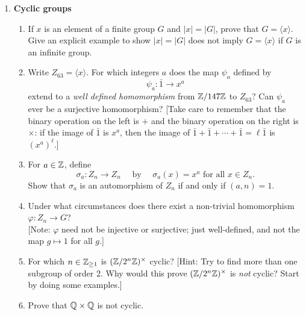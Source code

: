 \documentclass[11pt, reqno]{amsart}
\theoremstyle{plain}
\theoremstyle{definition}
\theoremstyle{example}
\def\<{\langle} \def\>{\rangle}
\def\f{\varphi}
\begin{document}
\begin{enumerate}[1.]
\begin{enumerate}[(a)]
\end{enumerate}

\item {\bf Cyclic groups}
\begin{enumerate}
\item If $x$ is an element of a finite group $G$ and $|x| = |G|$, prove that $G = \<x\>$. Give an explicit example to show $|x| = |G|$ does not imply $G = \<x\>$ if $G$ is an infinite group.
\item Write $Z_{63} = \<x\>$. For which integers $a$ does the map $\psi_a$ defined by 
$$\psi_a : \bar{1} \to x^a$$
extend to a \emph{well defined homomorphism} from $\mathbb{Z}/147 \mathbb{Z}$ to $Z_{63}$? Can $\psi_a$ ever be a surjective homomorphism? 
{\small[Take care to remember that the binary operation on the left is $+$ and the binary operation on the right is $\times$: if the image of  $\bar{1}$ is $x^a$, then the image of $\bar{1} + \bar{1} + \cdots + \bar{1} = \ell\bar{1}$ is $(x^{a})^{\ell}$.]}
\item For $a \in \mathbb{Z}$, define 
$$\sigma_a: Z_n \to Z_n \quad \text{ by } \quad \sigma_a(x) = x^a \text{ for all } x \in Z_n.$$
Show that $\sigma_a$ is an automorphism of $Z_n$ if and only if $(a, n) = 1$. 
\item Under what circumstances does there exist a non-trivial homomorphism $\f: Z_n \to G$? \\{\small[Note: $\f$ need not be injective or surjective; just well-defined, and not the map $g \mapsto 1$ for all $g$.]}
\item For which $n \in \mathbb{Z}_{\ge 1}$ is $(\mathbb{Z}/2^n\mathbb{Z})^\times$ cyclic? \hfill {\small[Hint: Try to find more than one subgroup of order 2. Why would this prove $(\mathbb{Z}/2^n\mathbb{Z})^\times$ is \emph{not} cyclic? Start by doing some examples.]}
\item Prove that $\mathbb{Q} \times \mathbb{Q}$ is not cyclic.
\end{enumerate}


\end{enumerate}
\end{document}
